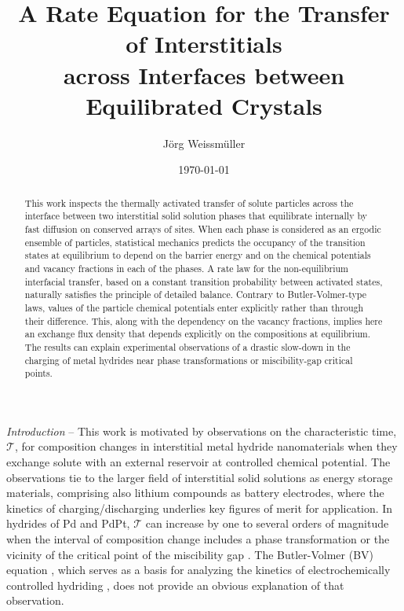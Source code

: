 \documentclass[english,aps,prb,showkeys,reprint]{revtex4-2}
\begin{document}
\title{A Rate Equation for the Transfer of Interstitials \\ across Interfaces between Equilibrated Crystals}

\author{Jörg Weissmüller}


\date{\today}

\begin{abstract}
This work inspects the thermally activated transfer of solute particles across the interface between two interstitial solid solution phases that equilibrate internally by fast diffusion on conserved arrays of sites. When each phase is considered as an ergodic ensemble of particles, statistical mechanics predicts the occupancy of the transition states at equilibrium to depend on the barrier energy and on the chemical potentials and vacancy fractions in each of the phases. A rate law for the non-equilibrium interfacial transfer, based on a constant transition probability between activated states, naturally satisfies the principle of detailed balance. Contrary to Butler-Volmer-type laws, values of the particle chemical potentials enter explicitly rather than through their difference. This, along with the dependency on the vacancy fractions, implies here an exchange flux density that depends explicitly on the compositions at equilibrium. The results can explain experimental observations of a drastic slow-down in the charging of metal hydrides near phase transformations or miscibility-gap critical points.
\end{abstract}


\maketitle

\textit{Introduction}
--
This work is motivated by observations on the characteristic time, $\mathcal T$, for composition changes in interstitial metal hydride nanomaterials when they exchange solute with an external reservoir at controlled chemical potential. The observations tie to the larger field of interstitial solid solutions as energy storage materials, comprising also lithium compounds as battery electrodes, where the kinetics of charging/discharging underlies key figures of merit for application. In hydrides of Pd and PdPt, $\mathcal T$ can increase by one to several orders of magnitude when the interval of composition change includes a phase transformation or the vicinity of the critical point of the miscibility gap \cite{ShanShi2017,BapariWeissmüller2025}. The Butler-Volmer (BV) equation \cite{Dickinson2020,Fletcher2023}, which serves as a basis for analyzing the kinetics of electrochemically controlled hydriding \cite{Montella1996,Pyun2005, Montella2005, WuerschumPdH2024}, does not provide an obvious explanation of that observation.
\end{document}
